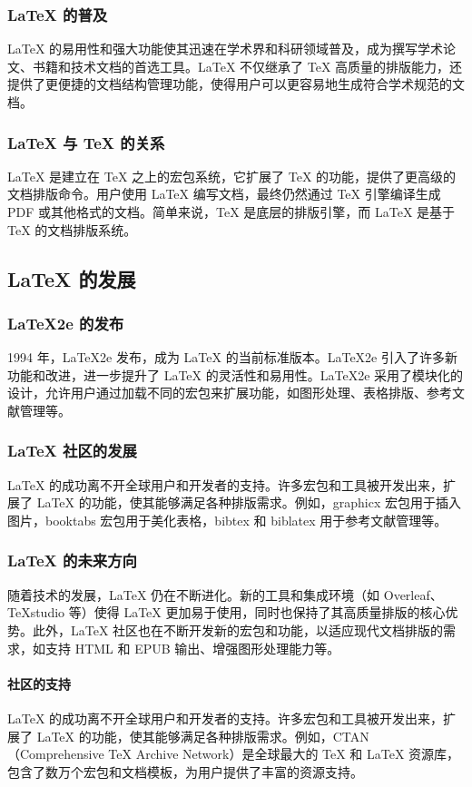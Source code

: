 \documentclass[UTF8,AutoFakeBold=1,AutoFakeSlant,zihao=-4]{SCAU}
\begin{document}
\subsubsection{LaTeX 的普及}
LaTeX 的易用性和强大功能使其迅速在学术界和科研领域普及，成为撰写学术论文、书籍和技术文档的首选工具。LaTeX 不仅继承了 TeX 高质量的排版能力，还提供了更便捷的文档结构管理功能，使得用户可以更容易地生成符合学术规范的文档。

\subsubsection{LaTeX 与 TeX 的关系}
LaTeX 是建立在 TeX 之上的宏包系统，它扩展了 TeX 的功能，提供了更高级的文档排版命令。用户使用 LaTeX 编写文档，最终仍然通过 TeX 引擎编译生成 PDF 或其他格式的文档。简单来说，TeX 是底层的排版引擎，而 LaTeX 是基于 TeX 的文档排版系统。

\subsection{LaTeX 的发展}
\subsubsection{LaTeX2e 的发布}
1994 年，LaTeX2e 发布，成为 LaTeX 的当前标准版本。LaTeX2e 引入了许多新功能和改进，进一步提升了 LaTeX 的灵活性和易用性。LaTeX2e 采用了模块化的设计，允许用户通过加载不同的宏包来扩展功能，如图形处理、表格排版、参考文献管理等。

\subsubsection{LaTeX 社区的发展}
LaTeX 的成功离不开全球用户和开发者的支持。许多宏包和工具被开发出来，扩展了 LaTeX 的功能，使其能够满足各种排版需求。例如，graphicx 宏包用于插入图片，booktabs 宏包用于美化表格，bibtex 和 biblatex 用于参考文献管理等。

\subsubsection{LaTeX 的未来方向}
随着技术的发展，LaTeX 仍在不断进化。新的工具和集成环境（如 Overleaf、TeXstudio 等）使得 LaTeX 更加易于使用，同时也保持了其高质量排版的核心优势。此外，LaTeX 社区也在不断开发新的宏包和功能，以适应现代文档排版的需求，如支持 HTML 和 EPUB 输出、增强图形处理能力等。

\paragraph{社区的支持}
LaTeX 的成功离不开全球用户和开发者的支持。许多宏包和工具被开发出来，扩展了 LaTeX 的功能，使其能够满足各种排版需求。例如，CTAN（Comprehensive TeX Archive Network）是全球最大的 TeX 和 LaTeX 资源库，包含了数万个宏包和文档模板，为用户提供了丰富的资源支持。
\end{document}
